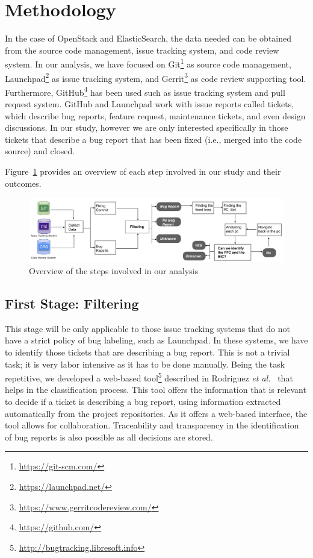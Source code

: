 \documentclass[a4paper, 12pt]{book}
\begin{document}
\section{Methodology}
\label{sec:methodology}

In the case of OpenStack and ElasticSearch, the data needed can be obtained from the source code management, issue tracking system, and code review system. In our analysis, we have focused on Git\footnote{\url{https://git-scm.com/}} as source code management, Launchpad\footnote{\url{https://launchpad.net/}} as issue tracking system, and Gerrit\footnote{\url{https://www.gerritcodereview.com/}} as code review supporting tool. Furthermore, GitHub\footnote{\url{https://github.com/}} has been used such as issue tracking system and pull request system. GitHub and Launchpad work with issue reports called tickets, which describe bug reports, feature request, maintenance tickets, and even design discussions. In our study, however we are only interested specifically in those tickets that describe a bug report that has been fixed (i.e., merged into the code source) and closed.

Figure~\ref{fig:diagram} provides an overview of each step involved in our study and their outcomes.

\begin{figure}[ht]
\centering
\includegraphics[width=\columnwidth]{img/diagram.png}
\caption{Overview of the steps involved in our analysis  }
\label{fig:diagram}       %
\end{figure}


\subsection{First Stage: Filtering}
\label{sec:methodologyFS}

This stage will be only applicable to those issue tracking systems that do not have a strict policy of bug labeling, such as Launchpad. In these systems, we have to identify those tickets that are describing a bug report. This is not a trivial task; it is very labor intensive as it has to be done manually. Being the task repetitive, we developed a web-based tool\footnote{\url{http://bugtracking.libresoft.info}} described in Rodriguez \emph{et al.}~\cite{rodriguez2016bugtracking} that helps in the classification process. This tool offers the information that is relevant to decide if a ticket is describing a bug report, using information extracted automatically from the project repositories. As it offers a web-based interface, the tool allows for collaboration. Traceability and transparency in the identification of bug reports is also possible as all decisions are stored.
\end{document}
